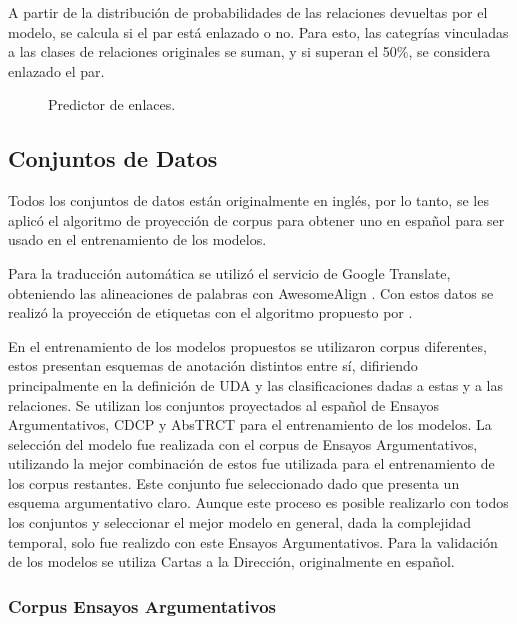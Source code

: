 \documentclass{rcci} %
\begin{document}
A partir de la distribuci\'on de probabilidades de las relaciones devueltas por el modelo,
se calcula si el par est\'a enlazado o no. Para esto, las categr\'ias vinculadas a las clases de relaciones 
originales se suman, y si superan el 50\%, se considera enlazado el par.

\begin{figure}[!h]
	\begin{center}
		
		
	\end{center}
	\caption{\fontsize{11}{12}\selectfont Predictor de enlaces.}
	\label{fig:link_predictor_model1}
\end{figure}

\subsection*{Conjuntos de Datos}

Todos los conjuntos de datos est\'an originalmente en ingl\'es, por lo tanto, se les aplic\'o el algoritmo de proyecci\'on
de corpus para obtener uno en espa\~nol para ser usado en el entrenamiento de los modelos.

Para la traducci\'on autom\'atica se utiliz\'o el servicio de Google Translate,
obteniendo las alineaciones de palabras con AwesomeAlign \citep{dou2021word}.
Con estos datos se realiz\'o la proyecci\'on de etiquetas con el algoritmo propuesto 
por \citep{eger2018cross}.

En el entrenamiento de los modelos propuestos se utilizaron corpus diferentes, estos
presentan esquemas de anotaci\'on distintos entre s\'i, difiriendo principalmente en la definici\'on de UDA y 
las clasificaciones dadas a estas y a las relaciones. Se utilizan los conjuntos proyectados al espa\~nol de 
Ensayos Argumentativos, CDCP y AbsTRCT para el entrenamiento de los modelos. La selecci\'on del
modelo fue realizada con el corpus de Ensayos Argumentativos, utilizando la mejor combinaci\'on de estos fue utilizada 
para el entrenamiento de los corpus restantes. Este conjunto fue seleccionado dado que presenta un esquema argumentativo
claro. Aunque este proceso es posible realizarlo con todos los conjuntos y seleccionar el mejor modelo en general, dada la 
complejidad temporal, solo fue realizdo con este Ensayos Argumentativos.
Para la validaci\'on de los modelos
se utiliza Cartas a la Direcci\'on, originalmente en espa\~nol.

\subsubsection*{Corpus Ensayos Argumentativos}\label{corpus:persuasive_essays}
\end{document}
